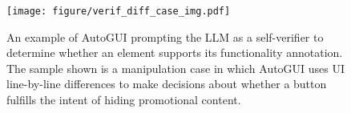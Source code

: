 \begin{figure}[th]
    \centering
    \texttt{[image: figure/verif\_diff\_case\_img.pdf]}
    \caption{An example of AutoGUI prompting the LLM as a self-verifier to determine whether an element supports its functionality annotation. The sample shown is a manipulation case in which AutoGUI uses UI line-by-line differences to make decisions about whether a button fulfills the intent of hiding promotional content.}
    \label{fig: verif diff case}
\end{figure}
